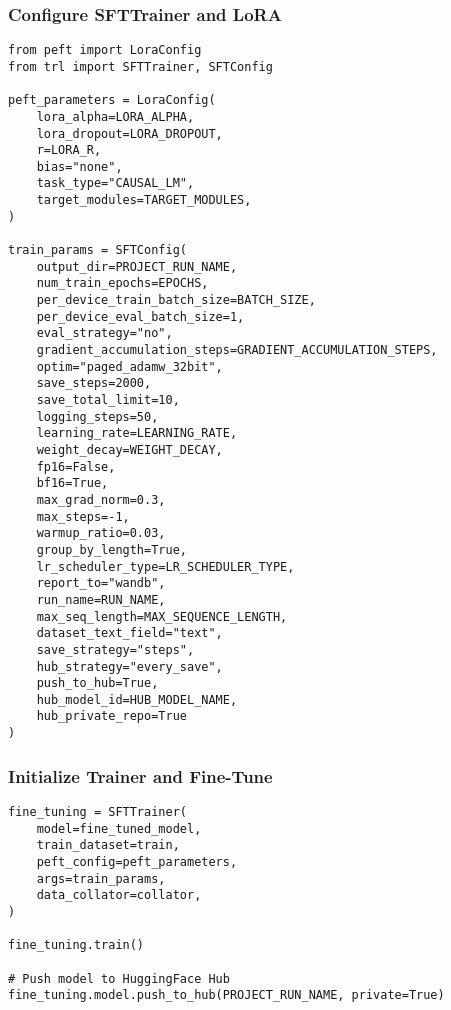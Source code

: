 \subsubsection{Configure SFTTrainer and LoRA}
\begin{tcolorbox}[colback=blue!5!white, colframe=blue!75!black, title=SFTTrainer Configuration]
\begin{verbatim}
from peft import LoraConfig
from trl import SFTTrainer, SFTConfig

peft_parameters = LoraConfig(
    lora_alpha=LORA_ALPHA,
    lora_dropout=LORA_DROPOUT,
    r=LORA_R,
    bias="none",
    task_type="CAUSAL_LM",
    target_modules=TARGET_MODULES,
)

train_params = SFTConfig(
    output_dir=PROJECT_RUN_NAME,
    num_train_epochs=EPOCHS,
    per_device_train_batch_size=BATCH_SIZE,
    per_device_eval_batch_size=1,
    eval_strategy="no",
    gradient_accumulation_steps=GRADIENT_ACCUMULATION_STEPS,
    optim="paged_adamw_32bit",
    save_steps=2000,
    save_total_limit=10,
    logging_steps=50,
    learning_rate=LEARNING_RATE,
    weight_decay=WEIGHT_DECAY,
    fp16=False,
    bf16=True,
    max_grad_norm=0.3,
    max_steps=-1,
    warmup_ratio=0.03,
    group_by_length=True,
    lr_scheduler_type=LR_SCHEDULER_TYPE,
    report_to="wandb",
    run_name=RUN_NAME,
    max_seq_length=MAX_SEQUENCE_LENGTH,
    dataset_text_field="text",
    save_strategy="steps",
    hub_strategy="every_save",
    push_to_hub=True,
    hub_model_id=HUB_MODEL_NAME,
    hub_private_repo=True
)
\end{verbatim}
\end{tcolorbox}

\subsubsection{Initialize Trainer and Fine-Tune}
\begin{tcolorbox}[colback=yellow!5!white, colframe=yellow!75!black, title=Fine-Tuning]
\begin{verbatim}
fine_tuning = SFTTrainer(
    model=fine_tuned_model,
    train_dataset=train,
    peft_config=peft_parameters,
    args=train_params,
    data_collator=collator,
)

fine_tuning.train()

# Push model to HuggingFace Hub
fine_tuning.model.push_to_hub(PROJECT_RUN_NAME, private=True)
\end{verbatim}
\end{tcolorbox}

